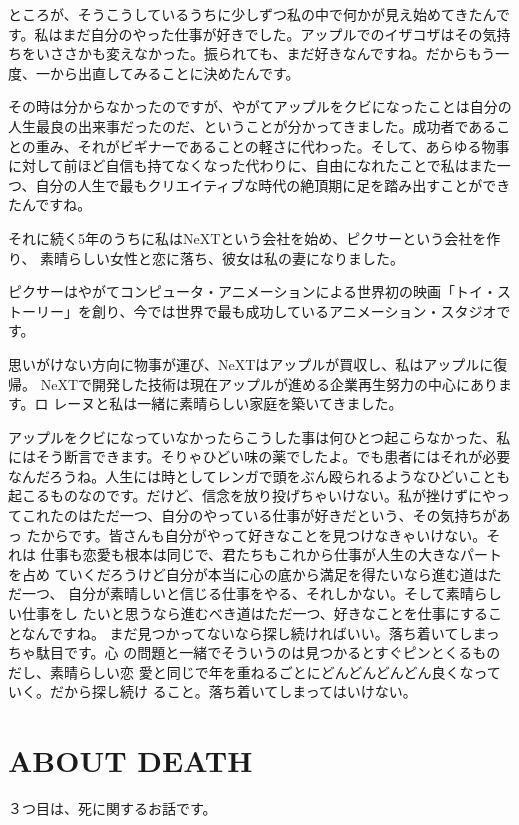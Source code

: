 \documentclass[a4paper,11pt,twocolumn]{jarticle}
\begin{document}
ところが、そうこうしているうちに少しずつ私の中で何かが見え始めてきたんで
す。私はまだ自分のやった仕事が好きでした。アップルでのイザコザはその気持
ちをいささかも変えなかった。振られても、まだ好きなんですね。だからもう一
度、一から出直してみることに決めたんです。

その時は分からなかったのですが、やがてアップルをクビになったことは自分の
人生最良の出来事だったのだ、ということが分かってきました。成功者であるこ
との重み、それがビギナーであることの軽さに代わった。そして、あらゆる物事
に対して前ほど自信も持てなくなった代わりに、自由になれたことで私はまた一
つ、自分の人生で最もクリエイティブな時代の絶頂期に足を踏み出すことができ
たんですね。

それに続く5年のうちに私はNeXTという会社を始め、ピクサーという会社を作り、
素晴らしい女性と恋に落ち、彼女は私の妻になりました。

ピクサーはやがてコンピュータ・アニメーションによる世界初の映画「トイ・ス
トーリー」を創り、今では世界で最も成功しているアニメーション・スタジオで
す。

思いがけない方向に物事が運び、NeXTはアップルが買収し、私はアップルに復帰。
NeXTで開発した技術は現在アップルが進める企業再生努力の中心にあります。ロ
レーヌと私は一緒に素晴らしい家庭を築いてきました。

アップルをクビになっていなかったらこうした事は何ひとつ起こらなかった、私
にはそう断言できます。そりゃひどい味の薬でしたよ。でも患者にはそれが必要
なんだろうね。人生には時としてレンガで頭をぶん殴られるようなひどいことも
起こるものなのです。だけど、信念を放り投げちゃいけない。私が挫けずにやっ
てこれたのはただ一つ、自分のやっている仕事が好きだという、その気持ちがあっ
たからです。皆さんも自分がやって好きなことを見つけなきゃいけない。それは
仕事も恋愛も根本は同じで、君たちもこれから仕事が人生の大きなパートを占め
ていくだろうけど自分が本当に心の底から満足を得たいなら進む道はただ一つ、
自分が素晴しいと信じる仕事をやる、それしかない。そして素晴らしい仕事をし
たいと思うなら進むべき道はただ一つ、好きなことを仕事にすることなんですね。
まだ見つかってないなら探し続ければいい。落ち着いてしまっちゃ駄目です。心
の問題と一緒でそういうのは見つかるとすぐピンとくるものだし、素晴らしい恋
愛と同じで年を重ねるごとにどんどんどんどん良くなっていく。だから探し続け
ること。落ち着いてしまってはいけない。

\section{ABOUT DEATH}

３つ目は、死に関するお話です。
\end{document}
